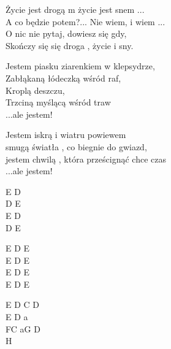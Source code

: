 \begin{text}
    Życie jest drogą m życie jest snem ...\\
    A co będzie potem?... Nie wiem, i wiem ...\\
    O nic nie pytaj, dowiesz się gdy,\\
    Skończy się się droga , życie i sny.

    Jestem piasku ziarenkiem w klepsydrze,\\
    Zabłąkaną łódeczką wśród raf,\\
    Kroplą deszczu,\\
    Trzciną myślącą wśród traw\\
    ...ale jestem!

    Jestem iskrą i wiatru powiewem\\
    smugą światła , co biegnie do gwiazd,\\
    jestem chwilą , która prześcignąć chce czas\\
    ...ale jestem!
\end{text}
\begin{chord}
    E D\\
    D E\\
    E D\\
    D E

    E D E\\
    E D E\\
    E D E\\
    E D E

    E D C D\\
    E D a\\
    FC aG D\\
    H
\end{chord}